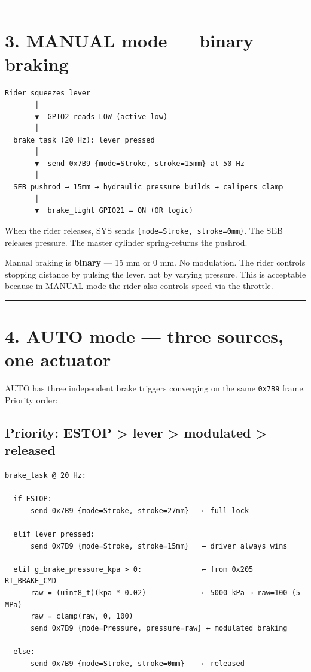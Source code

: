 \documentclass[12pt,a4paper,oneside]{report}
\begin{document}
\begin{center}\rule{0.5\linewidth}{0.5pt}\end{center}

\section{3. MANUAL mode --- binary braking}\label{manual-mode-binary-braking}

\begin{verbatim}
Rider squeezes lever
       │
       ▼  GPIO2 reads LOW (active-low)
       │
  brake_task (20 Hz): lever_pressed
       │
       ▼  send 0x7B9 {mode=Stroke, stroke=15mm} at 50 Hz
       │
  SEB pushrod → 15mm → hydraulic pressure builds → calipers clamp
       │
       ▼  brake_light GPIO21 = ON (OR logic)
\end{verbatim}

When the rider releases, SYS sends \texttt{\{mode=Stroke,\ stroke=0mm\}}. The
SEB releases pressure. The master cylinder spring-returns the pushrod.

Manual braking is \textbf{binary} --- 15 mm or 0 mm. No modulation. The rider
controls stopping distance by pulsing the lever, not by varying pressure. This
is acceptable because in MANUAL mode the rider also controls speed via the
throttle.

\begin{center}\rule{0.5\linewidth}{0.5pt}\end{center}

\section{4. AUTO mode --- three sources, one
actuator}\label{auto-mode-three-sources-one-actuator}

AUTO has three independent brake triggers converging on the same \texttt{0x7B9}
frame. Priority order:

\subsection{Priority: ESTOP \textgreater{} lever \textgreater{} modulated
\textgreater{} released}\label{priority-estop-lever-modulated-released}

\begin{verbatim}
brake_task @ 20 Hz:

  if ESTOP:
      send 0x7B9 {mode=Stroke, stroke=27mm}   ← full lock

  elif lever_pressed:
      send 0x7B9 {mode=Stroke, stroke=15mm}   ← driver always wins

  elif g_brake_pressure_kpa > 0:              ← from 0x205 RT_BRAKE_CMD
      raw = (uint8_t)(kpa * 0.02)             ← 5000 kPa → raw=100 (5 MPa)
      raw = clamp(raw, 0, 100)
      send 0x7B9 {mode=Pressure, pressure=raw} ← modulated braking

  else:
      send 0x7B9 {mode=Stroke, stroke=0mm}    ← released
\end{verbatim}
\end{document}
